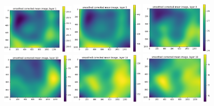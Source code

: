 \documentclass[letterpaper,11pt]{article}
\begin{document}
\begin{figure}[!ht]
\centering
\includegraphics[width=0.32\textwidth]{images/results/smoothed_corrected_mean_image_layers/smoothed_corrected_mean_image_layer_1}
\includegraphics[width=0.32\textwidth]{images/results/smoothed_corrected_mean_image_layers/smoothed_corrected_mean_image_layer_5}
\includegraphics[width=0.32\textwidth]{images/results/smoothed_corrected_mean_image_layers/smoothed_corrected_mean_image_layer_9}
\includegraphics[width=0.32\textwidth]{images/results/smoothed_corrected_mean_image_layers/smoothed_corrected_mean_image_layer_10}
\includegraphics[width=0.32\textwidth]{images/results/smoothed_corrected_mean_image_layers/smoothed_corrected_mean_image_layer_14}
\includegraphics[width=0.32\textwidth]{images/results/smoothed_corrected_mean_image_layers/smoothed_corrected_mean_image_layer_18}

\end{figure}
\end{document}
